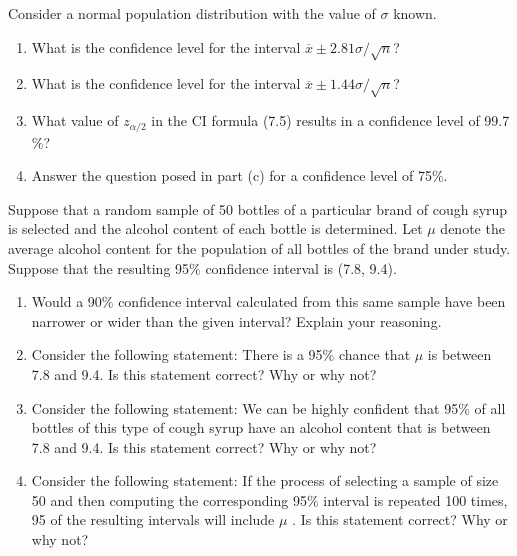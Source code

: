 \documentclass[11pt,letterpaper,boxed]{hmcpset}
\begin{document}
 {



\begin{problem}[7.1.1]
	Consider a normal population distribution with the value of $\sigma$ known.
	\begin{enumerate}
		\item
			What is the confidence level for the interval $\overline{x} \pm 2.81 \sigma / \sqrt{n}$?
		\item
			What is the confidence level for the interval $\overline{x} \pm 1.44 \sigma / \sqrt{n}$?
		\item
			What value of $z_{\alpha/2}$ in the CI formula (7.5) results in a confidence level of 99.7$\%$?
		\item
			Answer the question posed in part (c) for a confidence level of 75$\%$.
	\end{enumerate}
\end{problem}

\begin{solution}
	\vfill
\end{solution}
\newpage


\begin{problem}[7.1.3]
	Suppose that a random sample of 50 bottles of a particular brand of cough syrup is selected and the alcohol content of each bottle is determined. Let $\mu$ denote the average alcohol content for the population of all bottles of the brand under study. Suppose that the resulting 95$\%$ confidence interval is (7.8, 9.4).
	\begin{enumerate}
		\item
			Would a 90$\%$ confidence interval calculated from this same sample have been narrower or wider than the given interval? Explain your reasoning.
		\item
			Consider the following statement: There is a 95$\%$ chance that $\mu$ is between 7.8 and 9.4. Is this statement correct? Why or why not?
		\item
			Consider the following statement: We can be highly confident that 95$\%$ of all bottles of this type of cough syrup have an alcohol content that is between 7.8 and 9.4. Is this statement correct? Why or why not?
		\item
			Consider the following statement: If the process of selecting a sample of size 50 and then computing the corresponding 95$\%$ interval is repeated 100 times, 95 of the resulting intervals will include $\mu$ . Is this statement correct? Why or why not?
	\end{enumerate}
\end{problem}

}
\end{document}
